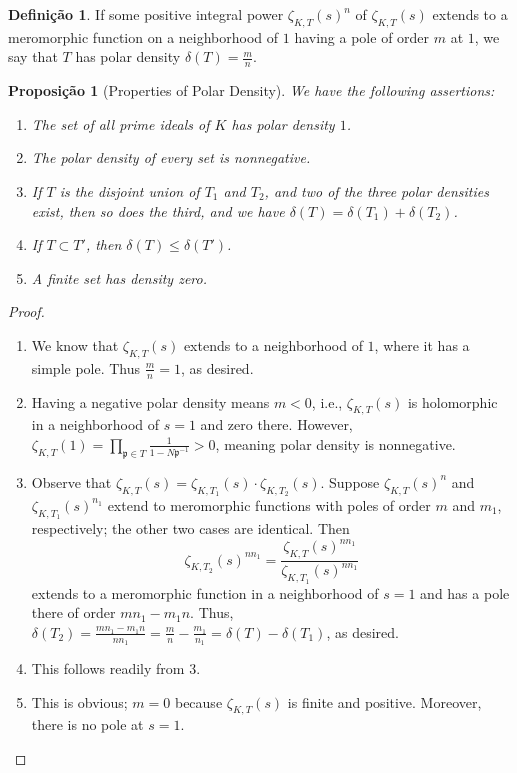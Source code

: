 \documentclass{article}
\theoremstyle{plain}
\newtheorem{prop}[thm]{Proposição}
\theoremstyle{definition}
\newtheorem{defn}[thm]{Definição}
\theoremstyle{remark}
\numberwithin{equation}{section}
\numberwithin{thm}{section}
\begin{document}
\begin{defn}
If some positive integral power $\zeta_{K, T}(s)^{n}$ of $\zeta_{K, T}(s)$ extends to a meromorphic function on a neighborhood of $1$ having a pole of order $m$ at $1$, we say that $T$ has polar density $\delta(T) = \frac{m}{n}$. 
\end{defn}

\begin{prop}[Properties of Polar Density]

We have the following assertions:

\begin{enumerate}
    \item The set of all prime ideals of $K$ has polar density $1$.
    \item The polar density of every set is nonnegative.
    \item If $T$ is the disjoint union of $T_1$ and $T_2$, and two of the three polar densities exist, then so does the third, and we have $\delta(T) = \delta(T_1) + \delta(T_2)$.
    \item If $T \subset T'$, then $\delta(T) \leq \delta(T')$.
    \item A finite set has density zero. 
\end{enumerate}

\end{prop}

\begin{proof}

$ $\\ \vspace{-0.4cm}

\begin{enumerate}

    \item We know that $\zeta_{K, T}(s)$ extends to a neighborhood of $1$, where it has a simple pole. Thus $\frac{m}{n} = 1$, as desired.
    \item Having a negative polar density means $m < 0$, i.e., $\zeta_{K, T}(s)$ is holomorphic in a neighborhood of $s = 1$ and zero there. However, $\zeta_{K, T}(1) = \prod_{\mathfrak{p} \in T} \frac{1}{1 - N\mathfrak{p}^{-1}} > 0$, meaning polar density is nonnegative.
    \item Observe that $\zeta_{K, T}(s) = \zeta_{K, T_1}(s) \cdot \zeta_{K, T_2}(s)$. Suppose $\zeta_{K, T}(s)^{n}$ and $\zeta_{K, T_1}(s)^{n_1}$ extend to meromorphic functions with poles of order $m$ and $m_1$, respectively; the other two cases are identical. Then $$\zeta_{K, T_2}(s)^{nn_1} = \frac{\zeta_{K, T}(s)^{nn_1}}{\zeta_{K, T_1}(s)^{nn_1}}$$ extends to a meromorphic function in a neighborhood of $s = 1$ and has a pole there of order $mn_1 - m_1n$. Thus, $\delta(T_2) = \frac{mn_1 - m_1n}{nn_1} = \frac{m}{n} - \frac{m_1}{n_1} = \delta(T) - \delta(T_1)$, as desired.
    \item This follows readily from 3. 
    \item This is obvious; $m = 0$ because $\zeta_{K, T}(s)$ is finite and positive. Moreover, there is no pole at $s = 1$.
\end{enumerate}

\end{proof}
\end{document}
